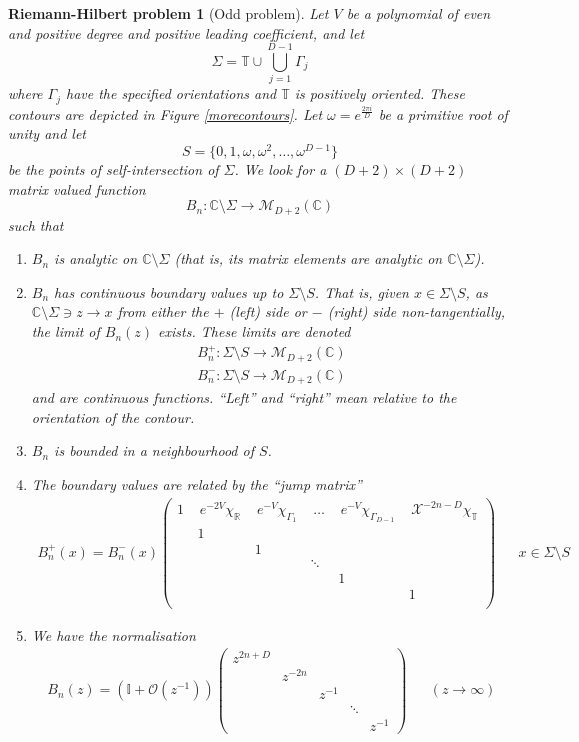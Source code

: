 \documentclass[12pt]{article}
\newtheorem{rhp}[theorem]{Riemann-Hilbert problem}
\theoremstyle{definition}
\begin{document}
\begin{rhp}[Odd problem]\label{oddrhp}
Let $V$ be a polynomial of even and positive degree and positive leading coefficient,  and let $$\Sigma = \mathbb{T} \cup  \bigcup_{j=1}^{D-1} \Gamma_j $$ where $\Gamma_j$ have the specified orientations and $\mathbb{T}$ is positively oriented.  These contours are depicted in Figure \ref{morecontours}.  Let $\omega = e^{\frac{2\pi i }{D}}$ be a primitive root of unity and let $$S = \{ 0, 1, \omega, \omega^2, \dots, \omega^{D-1} \}$$ be the points of self-intersection of $\Sigma$. We look for a $(D+2) \times (D+2)$ matrix valued function $$B_{n} : \mathbb{C}\setminus \Sigma \to  \mathcal{M}_{D+2}(\mathbb{C})$$ such that
\begin{enumerate}
\item $B_{n}$ is analytic on $\mathbb{C}\setminus \Sigma$ (that is, its matrix elements are analytic on $\mathbb{C}\setminus \Sigma$).
\item $B_{n}$ has continuous boundary values up to $\Sigma \setminus S$. That is,  given $x \in \Sigma \setminus S$,  as $\mathbb{C}\setminus \Sigma  \ni  z \to x$ from either the $+$ (left) side or $-$ (right) side non-tangentially,  the limit of $B_{n}(z)$ exists. These limits are denoted
\begin{align*}
B_{n}^+ : \Sigma \setminus S \to \mathcal{M}_{D+2}(\mathbb{C})\\
B_{n}^- : \Sigma \setminus S \to \mathcal{M}_{D+2}(\mathbb{C})
\end{align*}
and are continuous functions.  \enquote{Left} and \enquote{right} mean relative to the orientation of the contour. 
\item $B_{n}$ is bounded in a neighbourhood of $S$.
\item The boundary values are related by the \enquote{jump matrix}
\begin{align*}
B_{n}^{+}(x) = B_{n}^{-}(x)\left(
\begin{array}{ccccccccccccccccccc}
1 \,  & \, e^{-2V} \chi_\mathbb{R} \,  & \,  e^{-V} \chi_{\Gamma_1} \,   & \,  \dots \,  & \,  e^{-V} \chi_{\Gamma_{D-1}} \, & \, \mathscr{X}^{-2n-D} \chi_\mathbb{T}   \\
& 1 \\
& & 1 \\
& & & \ddots \\
& & & & 1 \\
& & & & & 1 \\
\end{array} \right) & & x \in \Sigma \setminus S
\end{align*}
\item We have the normalisation
\begin{align}
B_{n}(z) = \left(\mathbb{I}+ \mathcal{O}(z^{-1})\right) \left(\begin{matrix}
z^{2n+D} \\
& z^{-2n} \\
& & z^{-1} \\
& & & \ddots  \\
& & & & z^{-1}
\end{matrix} \right) & & (z \to \infty)
\end{align}
\end{enumerate}
\end{rhp}
\end{document}
